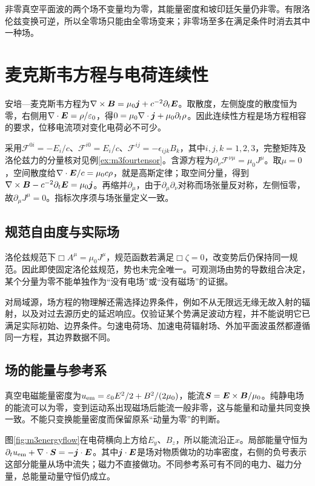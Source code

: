 非零真空平面波的两个场不变量均为零，其能量密度和坡印廷矢量仍非零。有限洛伦兹变换可逆，所以全零场只能由全零场变来；非零场至多在满足条件时消去其中一种场。

\section{麦克斯韦方程与电荷连续性}
安培—麦克斯韦方程为$\nabla\times\bm{B}=\mu_0\bm{j}+c^{-2}\partial_t\bm{E}$。取散度，左侧旋度的散度恒为零，右侧用$\nabla\cdot\bm{E}=\rho/\varepsilon_0$，得$0=\mu_0\nabla\cdot\bm{j}+\mu_0\partial_t\rho$。因此连续性方程是场方程相容的要求，位移电流项对变化电荷必不可少。

采用$\mathcal F^{0i}=-E_i/c$、$\mathcal F^{i0}=E_i/c$、$\mathcal F^{ij}=-\epsilon_{ijk}B_k$，其中$i,j,k=1,2,3$，完整矩阵及洛伦兹力的分量核对见例\ref{ex:m3fourtensor}。含源方程为$\partial_\nu\mathcal F^{\nu\mu}=\mu_0J^\mu$。取$\mu=0$，空间散度给$\nabla\cdot\bm{E}/c=\mu_0c\rho$，就是高斯定律；取空间分量，得到$\nabla\times\bm{B}-c^{-2}\partial_t\bm{E}=\mu_0\bm{j}$。再缩并$\partial_\mu$，由于$\partial_\mu\partial_\nu$对称而场张量反对称，左侧恒零，故$\partial_\mu J^\mu=0$。指标次序须与场张量定义一致。

\subsection{规范自由度与实际场}
洛伦兹规范下$\Box A^\mu=\mu_0J^\mu$，规范函数若满足$\Box\zeta=0$，改变势后仍保持同一规范。因此即使固定洛伦兹规范，势也未完全唯一。可观测场由势的导数组合决定，某个分量为零不能单独作为“没有电场”或“没有磁场”的证据。

对局域源，场方程的物理解还需选择边界条件，例如不从无限远无缘无故入射的辐射，以及对过去源历史的延迟响应。仅验证某个势满足波动方程，并不能说明它已满足实际初始、边界条件。匀速电荷场、加速电荷辐射场、外加平面波虽然都遵循同一方程，其边界数据不同。

\subsection{场的能量与参考系}
真空电磁能量密度为$u_{\rm em}=\varepsilon_0E^2/2+B^2/(2\mu_0)$，能流$\bm{S}=\bm{E}\times\bm{B}/\mu_0$。纯静电场的能流可以为零，变到运动系出现磁场后能流一般非零，这与能量和动量共同变换一致。不能只变换能量密度而保留原系“动量为零”的判断。

图\ref{fig:m3energyflow}在电荷横向上方给$E_y$、$B_z$，所以能流沿正$x$。局部能量守恒为$\partial_tu_{\rm em}+\nabla\cdot\bm{S}=-\bm{j}\cdot\bm{E}$。其中$\bm{j}\cdot\bm{E}$是场对物质做功的功率密度，右侧的负号表示这部分能量从场中流失；磁力不直接做功。不同参考系可有不同的电力、磁力分量，总能量动量守恒仍成立。

